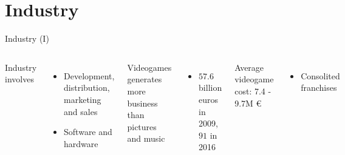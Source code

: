 \documentclass[10pt,compress]{beamer} %
\begin{document}
\section[Industry]{Industry}
\begin{frame}{Industry (I)}
    \begin{columns}
	Industry involves
	\begin{itemize}
		\item Development, distribution, marketing and sales
		\item Software and hardware
	\end{itemize}

	Videogames generates more business than pictures and music
	\begin{itemize}
		\item $57.6$ billion euros in 2009, $91$ in 2016
	\end{itemize}
	Average videogame cost: 7.4 - 9.7M \euro
	\begin{itemize}
		\item Consolited franchises
	\end{itemize}

	    \includegraphics[width=\linewidth]{figs/market}
    \end{columns}
\end{frame}
\end{document}
